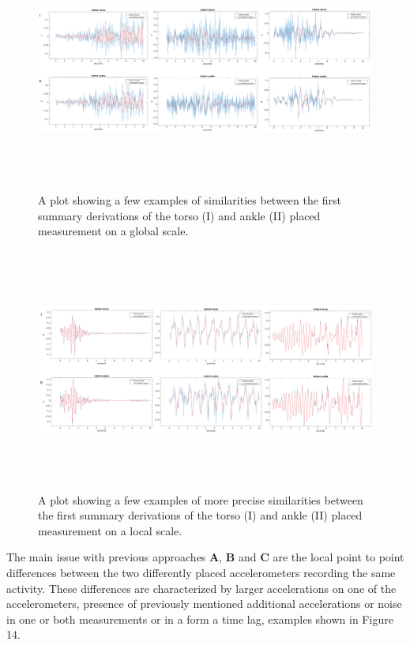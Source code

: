 \documentclass{article}
\begin{document}
{\newpage
\begin{figure}[h!]
\includegraphics[width=15cm, height=8cm]{roughSimilar.png}
\caption{A plot showing a few examples of similarities between the first summary derivations of the torso (I) and ankle (II) placed measurement on a global scale.}
\end{figure}
\begin{figure}[h!]
\includegraphics[width=15cm, height=8cm]{localSimilar.png}
\caption{A plot showing a few examples of more precise similarities between the first summary derivations of the torso (I) and ankle (II) placed measurement on a local scale.}
\end{figure}
\newpage
The main issue with previous approaches \textbf{A}, \textbf{B} and \textbf{C} are the local point to point differences between the two differently placed accelerometers recording the same activity. These differences are characterized by larger accelerations on one of the accelerometers, presence of previously mentioned additional accelerations or noise in one or both measurements or in a form a time lag, examples shown in Figure 14.
}
\end{document}
